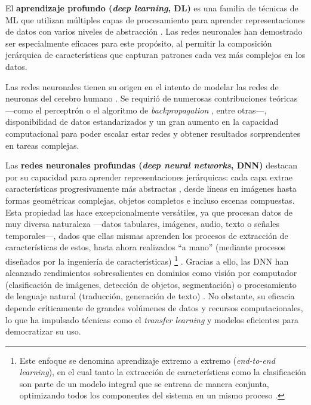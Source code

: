 El \textbf{aprendizaje profundo (\textit{deep learning}, \acrshort{DL})} es una familia de técnicas de \acrshort{ML} que utilizan múltiples capas de procesamiento para aprender representaciones de datos con varios niveles de abstracción \cite{lecun2015}. Las redes neuronales han demostrado ser especialmente eficaces para este propósito, al permitir la composición jerárquica de características que capturan patrones cada vez más complejos en los datos.

Las redes neuronales tienen su origen en el intento de modelar las redes de neuronas del cerebro humano \cite{mcculloch1943}. Se requirió de numerosas contribuciones teóricas ---como el perceptrón \cite{rosenblatt1958} o el algoritmo de \textit{backpropagation} \cite{rumelhart1986,werbos1994}, entre otras---, disponibilidad de datos estandarizados y un gran aumento en la capacidad computacional para poder escalar estar redes y obtener resultados sorprendentes en tareas complejas.

Las \textbf{redes neuronales profundas (\textit{deep neural networks}, \acrshort{DNN})} destacan por su capacidad para 
aprender representaciones jerárquicas: cada capa extrae características progresivamente más abstractas 
\cite{lecun2015}, desde líneas en imágenes hasta formas geométricas complejas, objetos completos e incluso 
escenas compuestas.
Esta propiedad las hace excepcionalmente versátiles, ya que procesan datos de muy diversa naturaleza ---datos 
tabulares, imágenes, audio, texto o señales temporales---, dados que ellas mismas aprenden los procesos de 
extracción de características de estos, hasta ahora realizados ``a mano'' (mediante procesos diseñados por la 
ingeniería de características)%
\footnote{
    Este enfoque se denomina aprendizaje extremo a extremo (\textit{end-to-end learning}), en el cual tanto la 
    extracción de características como la clasificación son parte de un modelo integral que se entrena de 
    manera conjunta, optimizando todos los componentes del sistema en un mismo proceso \cite{rusell2021}.
}
\cite{rusell2021}. 
Gracias a ello, las \acrshort{DNN} han alcanzado rendimientos sobresalientes en dominios como visión por computador 
(clasificación de imágenes, detección de objetos, segmentación) o procesamiento de lenguaje natural 
(traducción, generación de texto) \cite{redhat2024DeepLearningDefinition}.
No obstante, su eficacia depende críticamente de grandes volúmenes de datos y recursos computacionales, lo que 
ha impulsado técnicas como el \textit{transfer learning} y modelos eficientes para democratizar su uso.


